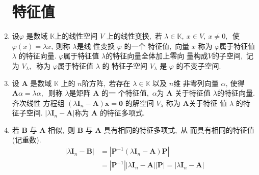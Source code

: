 \begin{enumerate}
		\section{特征值}
		\item 设$  \varphi $ 是数域  $\mathbb{K}  $上的线性空间 $ V $ 上的线性变换,\ 若  $\lambda \in \mathbb{K},\  x \in V,\  x \neq 0 ,\ $ 使  $\varphi(x)=\lambda x ,\  $则称  $\lambda  $是线 性变换  $\varphi$  的一个 特征值,\  向量 $ x$  称为  $\varphi  $属于特征值 $ \lambda$  的特征向量.  $\varphi  $属于特征值 $ \lambda  $的特征向量全体加上零向 量构成$  V  $的子空间,\  记为 $ V_{\lambda} ,\ $ 称为 $ \varphi  $属于特征值 $ \lambda $ 的 特征子空间 $ V_{\lambda} $ 是  $\varphi $ 的不变子空间.
		\item 设 $ \boldsymbol{A}$  是数域 $ \mathbb{K} $ 上的 $ n  $阶方阵,\  若存在  $\lambda \in \mathbb{K} $ 以及 $ n  $维 非雩列向量  $\alpha ,\  $使得  $\boldsymbol{A} \alpha=\lambda \alpha ,\ $ 则称  $\lambda  $是矩阵  $\boldsymbol{A}$  的一 个特征值,\  $\alpha  $为  $\boldsymbol{A} $ 关于特征值  $\lambda  $的特征向量. 齐次线性 方程组 $ \left(\lambda \boldsymbol{I}_{n}-\boldsymbol{A}\right) \boldsymbol{x}=\mathbf{0}$  的解空间 $ V_{\lambda} $ 称为  $\boldsymbol{A}  $关于特征 值  $\lambda $ 的特征子空间.  $\left|\lambda \boldsymbol{I}_{n}-\boldsymbol{A}\right|  $称为  $\boldsymbol{A} $ 的特征多项式.
		
		\item 若  $\boldsymbol{B} $ 与 $ \boldsymbol{A} $ 相似,\  则 $ \boldsymbol{B}$  与  $\boldsymbol{A}$  具有相同的特征多项式,\  从 而具有相同的特征值 (记重数).
		$$\begin{aligned}
			\left|\lambda \boldsymbol{I}_{n}-\boldsymbol{B}\right| &=\left|\boldsymbol{P}^{-1}\left(\lambda \boldsymbol{I}_{n}-\boldsymbol{A}\right) \boldsymbol{P}\right| \\
			&=\left|\boldsymbol{P}^{-1}\right|\left|\lambda \boldsymbol{I}_{n}-\boldsymbol{A}\right||\boldsymbol{P}|=\left|\lambda \boldsymbol{I}_{n}-\boldsymbol{A}\right|
		\end{aligned}$$
		

\end{enumerate}
